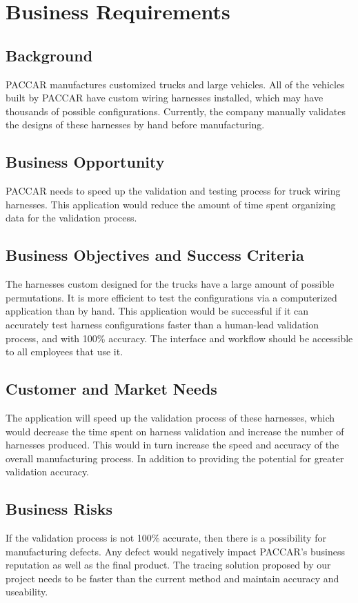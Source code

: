 \section{Business Requirements}
\subsection{Background}
 PACCAR manufactures customized trucks and large vehicles. All of the vehicles built by PACCAR have custom wiring harnesses installed, which may have thousands of possible configurations. Currently, the company manually validates the designs of these harnesses by hand before manufacturing.

\subsection{Business Opportunity}
PACCAR needs to speed up the validation and testing process for truck wiring harnesses. This application would reduce the amount of time spent organizing data for the validation process.

\subsection{Business Objectives and Success Criteria}
The harnesses custom designed for the trucks have a large amount of possible permutations. It is more efficient to test the configurations via a computerized application than by hand. This application would be successful if it can accurately test harness configurations faster than a human-lead validation process, and with 100\% accuracy. The interface and workflow should be accessible to all employees that use it.

\subsection{Customer and Market Needs}
 The application will speed up the validation process of these harnesses, which would decrease the time spent on harness validation and increase the number of harnesses produced. This would in turn increase the speed and accuracy of the overall manufacturing process. In addition to providing the potential for greater validation accuracy.
 

\subsection{Business Risks}
If the validation process is not 100\% accurate, then there is a possibility for manufacturing defects. Any defect would negatively impact PACCAR's business reputation as well as the final product. The tracing solution proposed by our project needs to be faster than the current method and maintain accuracy and useability. 


